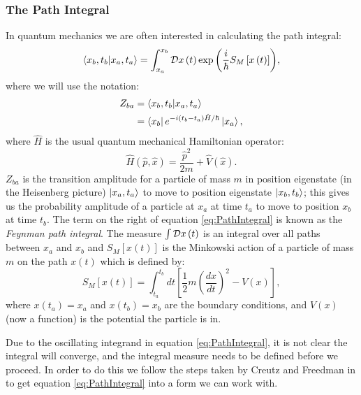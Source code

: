\documentclass[12pt]{article}
\begin{document}
        \subsubsection{The Path Integral}
        \label{sec:QuantumMechanics}
        In quantum mechanics we are often interested in calculating the path integral:
        \begin{equation}
            \label{eq:PathIntegral}
            \braket{x_b,t_b|x_a,t_a} = \int_{x_a}^{x_b} {\cal D} x\left(t\right) \exp{\left(\frac{i}{\hbar} S_M\left[x\left(t\right)\right]\right)},
        \end{equation}
        where we will use the notation:
        \begin{align}
            \label{eq:PathIntegralZ_fi}
            Z_{ba} & = \braket{x_b,t_b|x_a,t_a} \\
            \label{eq:PathIntegralZ_fi2}
                   & = \bra{x_b}e^{-i\left(t_b-t_a\right)\hat{H}/\hbar}\ket{x_a},
        \end{align}
        where $\hat{H}$ is the usual quantum mechanical Hamiltonian operator:
        \begin{equation}
            \hat{H}\left(\hat{p},\hat{x}\right) = \frac{\hat{p}^2}{2m} + \hat{V}\left(\hat{x}\right).
        \end{equation} 
        $Z_{ba}$ is the transition amplitude for a particle of mass $m$ in position eigenstate (in the Heisenberg picture) $\ket{x_a,t_a}$ to move to position eigenstate $\ket{x_b,t_b}$; this gives us the probability amplitude of a particle at $x_a$ at time $t_a$ to move to position $x_b$ at time $t_b$. The term on the right of equation \ref{eq:PathIntegral} is known as the \textit{Feynman path integral}. The measure $\int {\cal D} x\left(t\right)$ is an integral over all paths between $x_a$ and $x_b$ and $S_M\left[x\left(t\right)\right]$ is the Minkowski action of a particle of mass $m$ on the path $x\left(t\right)$ which is defined by:
        \begin{equation}
            \label{eq:MinkowskiAction}
            S_M\left[x\left(t\right)\right] = \int_{t_a}^{t_b} dt \left[\frac{1}{2}m\left(\frac{dx}{dt}\right)^2 - V(x)\right],
        \end{equation}
        where $x\left(t_a\right) = x_a$ and $x\left(t_b\right) = x_b$ are the boundary conditions, and $V\left(x\right)$ (now a function) is the potential the particle is in.

        Due to the oscillating integrand in equation \ref{eq:PathIntegral}, it is not clear the integral will converge, and the integral measure needs to be defined before we proceed. In order to do this we follow the steps taken by Creutz and Freedman in \cite{creutz_freedman_1981} to get equation \ref{eq:PathIntegral} into a form we can work with.
\end{document}
